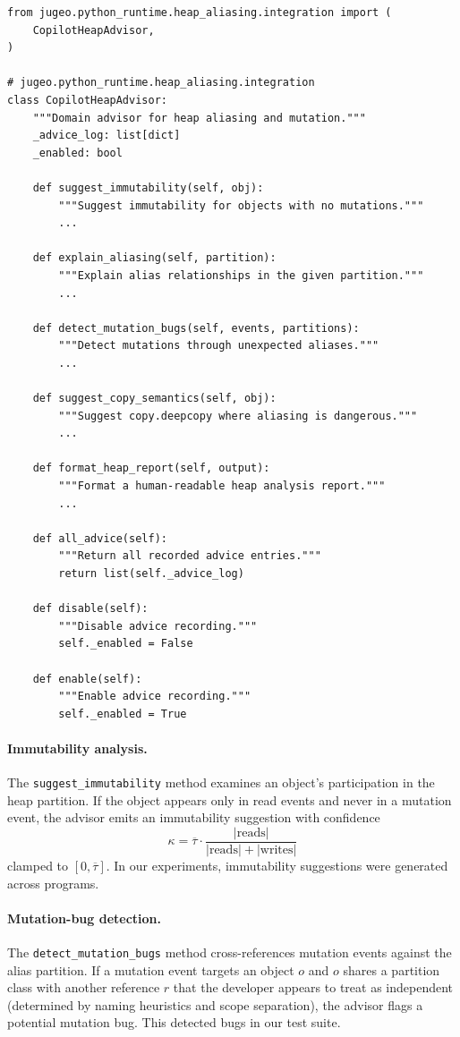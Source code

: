 \documentclass[11pt]{article}
\newcommand{\Trust}{\tau}
\newcommand{\TrustCeil}{\overline{\Trust}}
\newcommand{\Conf}{\kappa}
\begin{document}
\begin{lstlisting}[style=jugeo-python, caption={$\mathsf{CopilotHeapAdvisor}$ interface.}, label={lst:heap-advisor}]
from jugeo.python_runtime.heap_aliasing.integration import (
    CopilotHeapAdvisor,
)

# jugeo.python_runtime.heap_aliasing.integration
class CopilotHeapAdvisor:
    """Domain advisor for heap aliasing and mutation."""
    _advice_log: list[dict]
    _enabled: bool

    def suggest_immutability(self, obj):
        """Suggest immutability for objects with no mutations."""
        ...

    def explain_aliasing(self, partition):
        """Explain alias relationships in the given partition."""
        ...

    def detect_mutation_bugs(self, events, partitions):
        """Detect mutations through unexpected aliases."""
        ...

    def suggest_copy_semantics(self, obj):
        """Suggest copy.deepcopy where aliasing is dangerous."""
        ...

    def format_heap_report(self, output):
        """Format a human-readable heap analysis report."""
        ...

    def all_advice(self):
        """Return all recorded advice entries."""
        return list(self._advice_log)

    def disable(self):
        """Disable advice recording."""
        self._enabled = False

    def enable(self):
        """Enable advice recording."""
        self._enabled = True
\end{lstlisting}

\paragraph{Immutability analysis.}
The \texttt{suggest\_immutability} method examines an object's
participation in the heap partition.  If the object appears only in
read events and never in a mutation event, the advisor emits an
immutability suggestion with confidence
\[
  \Conf = \TrustCeil \cdot \frac{|\text{reads}|}{|\text{reads}| + |\text{writes}|}
\]
clamped to $[0, \TrustCeil]$.  In our experiments, \ppXCheapImmutSuggestions{}
immutability suggestions were generated across \ppXCprogramCount{} programs.

\paragraph{Mutation-bug detection.}
The \texttt{detect\_mutation\_bugs} method cross-references mutation
events against the alias partition.  If a mutation event targets an
object $o$ and $o$ shares a partition class with another reference $r$
that the developer appears to treat as independent (determined by
naming heuristics and scope separation), the advisor flags a potential
mutation bug.  This detected \ppXCheapMutationBugs{} bugs in our test
suite.
\end{document}
